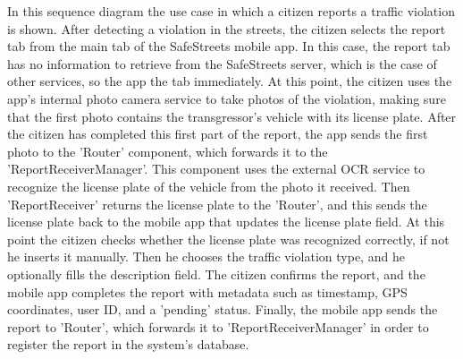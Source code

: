 In this sequence diagram the use case in which a citizen reports a traffic violation is shown. After detecting a violation in the streets, the citizen selects the report tab from the main tab of the SafeStreets mobile app. In this case, the report tab has no information to retrieve from the SafeStreets server, which is the case of other services, so the app the tab immediately. At this point, the citizen uses the app's internal photo camera service to take photos of the violation, making sure that the first photo contains the transgressor's vehicle with its license plate. After the citizen has completed this first part of the report, the app sends the first photo to the 'Router' component, which forwards it to the 'ReportReceiverManager'. This component uses the external OCR service to recognize the license plate of the vehicle from the photo it received. Then 'ReportReceiver' returns the license plate to the 'Router', and this sends the license plate back to the mobile app that updates the license plate field. At this point the citizen checks whether the license plate was recognized correctly, if not he inserts it manually. Then he chooses the traffic violation type, and he optionally fills the description field. The citizen confirms the report, and the mobile app completes the report with metadata such as timestamp, GPS coordinates, user ID, and a 'pending' status. Finally, the mobile app sends the report to 'Router', which forwards it to 'ReportReceiverManager' in order to register the report in the system's database.

